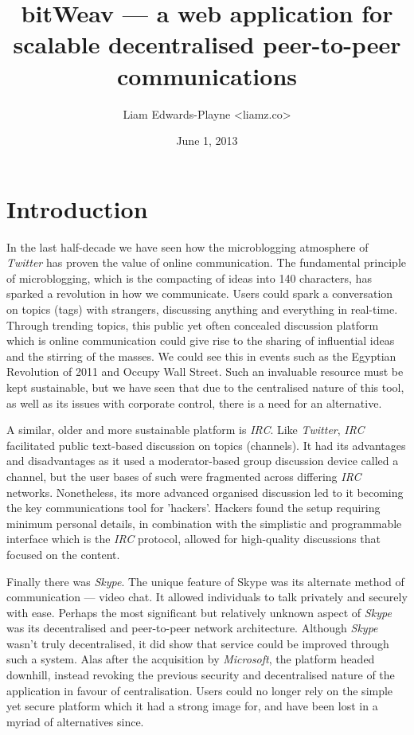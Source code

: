 \documentclass[10pt,a4paper,onecolumn]{article}
\author{Liam Edwards-Playne \textless liamz.co\textgreater}
\date{June 1, 2013}
\title{bitWeav — a web application for scalable decentralised peer-to-peer  communications}
\begin{document}
\maketitle
\begin{abstract}
\end{abstract}

\section{Introduction}
\label{intro}
In the last half-decade we have seen how the microblogging atmosphere of \emph{Twitter} has proven the value of online communication. The fundamental principle of microblogging, which is the compacting of ideas into 140 characters, has sparked a revolution in how we communicate. Users could spark a conversation on topics (tags) with strangers, discussing anything and everything in real-time. Through trending topics, this public yet often concealed discussion platform which is online communication could give rise to the sharing of influential ideas and the stirring of the masses. We could see this in events such as the Egyptian Revolution of 2011 and Occupy Wall Street. Such an invaluable resource must be kept sustainable, but we have seen that due to the centralised nature of this tool, as well as its issues with corporate control, there is a need for an alternative. 

A similar, older and more sustainable platform is \emph{IRC}. Like \emph{Twitter}, \emph{IRC} facilitated public text-based discussion on topics (channels). It had its advantages and disadvantages as it used a moderator-based group discussion device called a channel, but the user bases of such were fragmented across differing \emph{IRC} networks. Nonetheless, its more advanced organised discussion led to it becoming the key communications tool for 'hackers'. Hackers found the setup requiring minimum personal details, in combination with the simplistic and programmable interface which is the \emph{IRC} protocol, allowed for high-quality discussions that focused on the content. 

Finally there was \emph{Skype}. The unique feature of Skype was its alternate method of communication — video chat. It allowed individuals to talk privately and securely with ease. Perhaps the most significant but relatively unknown aspect of \emph{Skype} was its decentralised and peer-to-peer network architecture. Although \emph{Skype} wasn't truly decentralised, it did show that service could be improved through such a system. Alas after the acquisition by \textit{Microsoft}, the platform headed downhill, instead revoking the previous security and decentralised nature of the application in favour of centralisation. Users could no longer rely on the simple yet secure platform which it had a strong image for, and have been lost in a myriad of alternatives since. 
\end{document}
